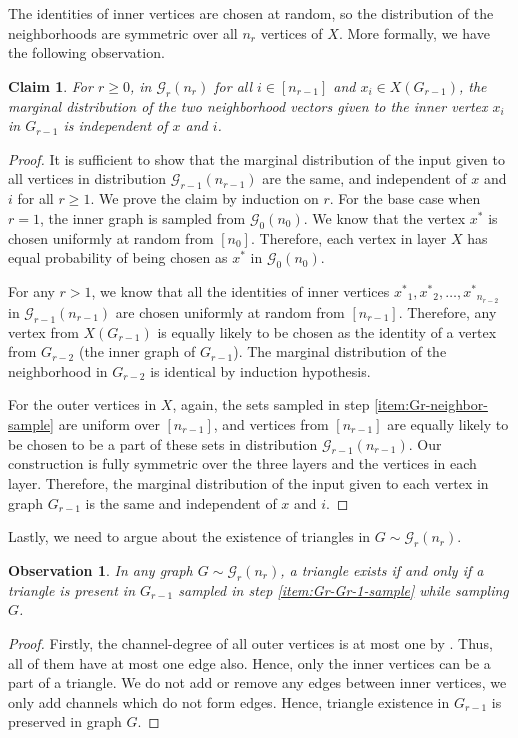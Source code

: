 \documentclass[11pt]{article}
\newtheorem{claim}[lemma]{Claim}
\newtheorem{observation}[lemma]{Observation}
\theoremstyle{definition}
\renewcommand{\geq}{\geqslant}
\newcommand{\xstar}{\ensuremath{x^{*}}}
\newcommand{\cG}{\ensuremath{\mathcal{G}}}
\begin{document}
The identities of inner vertices are chosen at random, so the distribution of the neighborhoods are symmetric over all $n_r$ vertices of $X$. More formally, we have the following observation. 
\begin{claim}\label{clm:symmetry-over-layer}
	For $r \geq 0$, in $\cG_r(n_r)$ for all $i \in [n_{r-1}]$ and $x_i \in X(G_{r-1})$, the marginal distribution of the two neighborhood vectors given to the inner vertex $x_i$ in $G_{r-1}$ is independent of $x$ and $i$.
\end{claim}
\begin{proof}
	It is sufficient to show that the marginal distribution of the input given to all vertices in distribution $\cG_{r-1}(n_{r-1})$ are the same, and independent of $x$ and $i$ for all $r \geq 1$. 
	We prove the claim by induction on $r$. 
	For the base case when $r = 1$, the inner graph is sampled from $\cG_0(n_0)$. We know that the vertex $\xstar$ is chosen uniformly at random from $[n_0]$. Therefore, each vertex in layer $X$ has equal probability of being chosen as $\xstar$ in $\cG_0(n_0)$. 
	
	For any $r > 1$, we know that all the identities of inner vertices $\xstar_1, \xstar_2, \ldots, \xstar_{n_{r-2}}$ in $\cG_{r-1}(n_{r-1})$ are chosen uniformly at random from $[n_{r-1}]$. Therefore, any vertex from $X(G_{r-1})$ is equally likely to be chosen as the identity of a vertex from $G_{r-2}$ (the inner graph of $G_{r-1}$). The marginal distribution of the neighborhood in $G_{r-2}$ is identical by induction hypothesis. 
	
	For the outer vertices in $X$, again, the sets sampled in step \ref{item:Gr-neighbor-sample} are uniform over $[n_{r-1}]$, and vertices from $[n_{r-1}]$ are equally likely to be chosen to be a part of these sets in distribution $\cG_{r-1}(n_{r-1})$. Our construction is fully symmetric over the three layers and the vertices in each layer. Therefore, the marginal distribution of the input given to each vertex in graph $G_{r-1}$ is the same and independent of $x$ and $i$. 
\end{proof}

Lastly, we need to argue about the existence of triangles in $G \sim \cG_r(n_r)$.

\begin{observation}\label{obs:r-triangle-exist}
	In any graph $G \sim \cG_r(n_r)$, a triangle exists if and only if a triangle is present in $G_{r-1}$ sampled in step \ref{item:Gr-Gr-1-sample} while sampling $G$.
\end{observation}
\begin{proof}
	Firstly, the channel-degree of all outer vertices is at most one by . Thus, all of them have at most one edge also. Hence, only the inner vertices can be a part of a triangle. We do not add or remove any edges between inner vertices, we 
	only add channels which do not form edges. Hence, triangle existence in $G_{r-1}$ is preserved in graph $G$. 
\end{proof}
\end{document}

